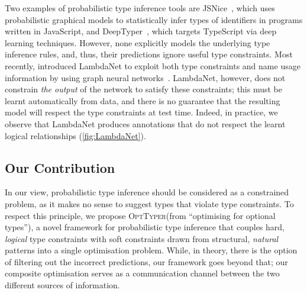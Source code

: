 \documentclass[acmsmall, review, anonymous]{acmart}\settopmatter{printfolios=true,printccs=false,printacmref=false}
\newcommand{\projectname}{\textsc{OptTyper}\xspace}
\begin{document}
Two examples of probabilistic type inference tools are JSNice~\cite{raychev15},
which uses probabilistic graphical models to statistically infer types of identifiers
in programs written in JavaScript,
and DeepTyper~\cite{hellendoorn18}, which targets TypeScript via deep learning techniques.
However, none explicitly models the underlying
type inference rules, and, thus, their predictions ignore useful type constraints.
%
Most recently, \citet{wei20} introduced LambdaNet to exploit both type constraints and name usage information by using graph neural networks~\citep{allamanis17}. LambdaNet, however, does not constrain 
\emph{the output} of the network to satisfy these constraints;
this must be learnt automatically from data,
and there is no guarantee that the resulting model will respect the type constraints at test time. 
Indeed, in practice, we observe that LambdaNet
produces annotations that do not respect the learnt 
logical relationships (\cref{fig:LambdaNet}).


\subsection{Our Contribution}

In our view, probabilistic type inference should be considered as a constrained problem, as it makes no sense to suggest types that violate type constraints. To respect this principle, we propose \projectname (from ``optimising for optional types''), a novel framework for probabilistic type inference that couples hard, \textit{logical} type constraints with soft constraints drawn from structural, \textit{natural} patterns into a single optimisation problem. While, in theory, there is the option of filtering out the incorrect predictions, our framework goes beyond that; our composite optimisation serves as a communication channel between the two different sources of information. 

\end{document}
